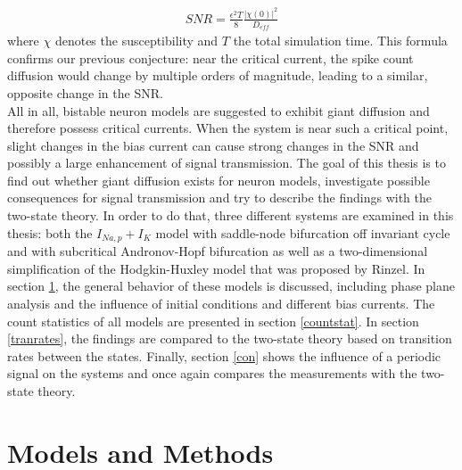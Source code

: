 \documentclass[12pt,a4paper]{article}
\begin{document}
\begin{align*}
SNR=\frac{\epsilon ^2T}{8}\frac{|\chi(0)|^2}{D_{eff}}
\end{align*}
where $\chi$ denotes the susceptibility and $T$ the total simulation time. This formula confirms our previous conjecture: near the critical current, the spike count diffusion would change by multiple orders of magnitude, leading to a similar, opposite change in the SNR. \\
All in all, bistable neuron models are suggested to exhibit giant diffusion and therefore possess critical currents. When the system is near such a critical point, slight changes in the bias current can cause strong changes in the SNR and possibly a large enhancement of signal transmission. The goal of this thesis is to find out whether giant diffusion exists for neuron models, investigate possible consequences for signal transmission and try to describe the findings with the two-state theory. In order to do that, three different systems are examined in this thesis: both the $I_{Na,p}+I_K$ model with saddle-node bifurcation off invariant cycle and with subcritical Andronov-Hopf bifurcation\cite{izi} as well as a two-dimensional simplification of the Hodgkin-Huxley model that was proposed by Rinzel\cite{rinzel}. In section \ref{modmet}, the general behavior of these models is discussed, including phase plane analysis and the influence of initial conditions and different bias currents. The count statistics of all models are presented in section \ref{countstat}. In section \ref{tranrates}, the findings are compared to the two-state theory based on transition rates between the states. Finally, section \ref{con} shows the influence of a periodic signal on the systems and once again compares the measurements with the two-state theory.
\newpage
\section{Models and Methods}\label{modmet}
\end{document}
